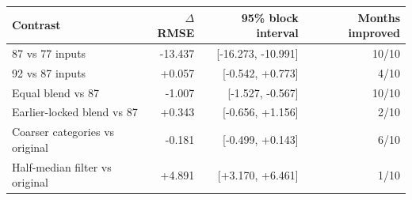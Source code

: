 \begin{tabular}{lrrr}
\toprule
Contrast & $\Delta$RMSE & 95\% block interval & Months improved \\
\midrule
87 vs 77 inputs & -13.437 & [-16.273, -10.991] & 10/10 \\
92 vs 87 inputs & +0.057 & [-0.542, +0.773] & 4/10 \\
Equal blend vs 87 & -1.007 & [-1.527, -0.567] & 10/10 \\
Earlier-locked blend vs 87 & +0.343 & [-0.656, +1.156] & 2/10 \\
Coarser categories vs original & -0.181 & [-0.499, +0.143] & 6/10 \\
Half-median filter vs original & +4.891 & [+3.170, +6.461] & 1/10 \\
\bottomrule
\end{tabular}
